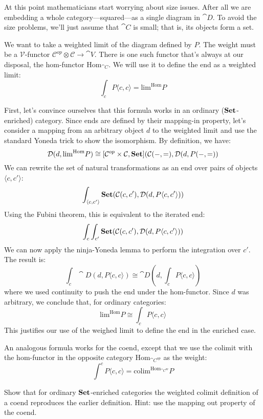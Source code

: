 \documentclass[DaoFP]{subfiles}
\begin{document}
At this point mathematicians start worrying about size issues. After all we are embedding a whole category---squared---as a single diagram in $\cat D$. To avoid the size problems, we'll just assume that $\cat C$ is small; that is, its objects form a set. 

We want to take a weighted limit of the diagram defined by $P$. The weight must be a $\mathcal V$-functor $\mathcal C^{op} \otimes \mathcal C \to \cat V$. There is one such functor that's always at our disposal, the hom-functor $\text{Hom}_{\cat C}$. We will use it to define the end as a weighted limit:
\[  \int_c P\langle c, c\rangle = \text{lim}^{\text{Hom}} P\]

First, let's convince ourselves that this formula works in an ordinary ($\mathbf{Set}$-enriched) category. Since ends are defined by their mapping-in property, let's consider a mapping from an arbitrary object $d$ to the weighted limit and use the standard Yoneda trick to show the isomorphism. By definition, we have:
\[ \mathcal{D}(d, \text{lim}^{\text{Hom}} P) \cong [\mathcal{C}^{op} \times \mathcal{C}, \mathbf{Set}](\mathcal{C}(-, =), \mathcal{D} (d, P(-, =))\]
We can rewrite the set of natural transformations as an end over pairs of objects $\langle c, c' \rangle$:
\[ \int_{\langle c, c' \rangle} \mathbf{Set}(\mathcal{C}(c, c'), \mathcal{D} (d, P\langle c, c' \rangle)) \]
Using the Fubini theorem, this is equivalent to the iterated end:
\[\int_c \int_{c'} \mathbf{Set}(\mathcal{C}(c, c'), \mathcal{D}(d, P\langle c, c' \rangle))\]
We can now apply the ninja-Yoneda lemma to perform the integration over $c'$. The result is:
\[ \int_c \cat D(d, P\langle c, c \rangle) \cong \cat D(d, \int_c P \langle c, c \rangle) \]
where we used continuity to push the end under the hom-functor. Since $d$ was arbitrary, we conclude that, for ordinary categories:
\[ \text{lim}^{\text{Hom}} P \cong  \int_c P\langle c, c\rangle \]
This justifies our use of the weighed limit to define the end in the enriched case.

An analogous formula works for the coend, except that we use the colimit with the hom-functor in the opposite category $\text{Hom}_{\cat C^{op}}$ as the weight:
\[  \int^c P\langle c, c\rangle = \text{colim}^{\text{Hom}_{\cat C^{op}}} P\]

\begin{exercise}
Show that for ordinary $\mathbf{Set}$-enriched categories the weighted colimit definition of a coend reproduces the earlier definition. Hint: use the mapping out property of the coend.
\end{exercise}
\end{document}
